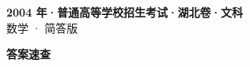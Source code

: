 \documentclass[zihao=-4, a4paper]{ctexart}
\begin{document}
\begin{center}
  {\Large\bfseries 2004 年·普通高等学校招生考试·湖北卷·文科}\\[4pt]
  {\large 数学 · 简答版}
\end{center}
\medskip
{}

\clearpage
{}
\begin{center}{\Large\bfseries 答案速查}\end{center}
\medskip

\end{document}
